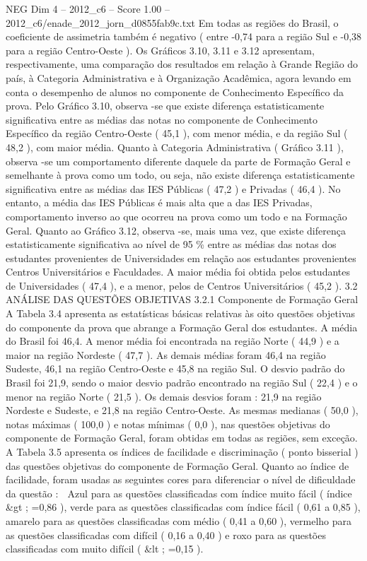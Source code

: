 \begin{textsample}{NEG Dim 4 – 2012\_c6 – Score 1.00 – 2012\_c6/enade\_2012\_jorn\_d0855fab9c.txt}
Em todas as regiões do Brasil, o coeficiente de assimetria também é negativo ( entre -0,74 para a região Sul e -0,38 para a região Centro-Oeste ).
Os Gráficos 3.10, 3.11 e 3.12 apresentam, respectivamente, uma comparação dos resultados em relação à Grande Região do país, à Categoria Administrativa e à Organização Acadêmica, agora levando em conta o desempenho de alunos no componente de Conhecimento Específico da prova.
Pelo Gráfico 3.10, observa -se que existe diferença estatisticamente significativa entre as médias das notas no componente de Conhecimento Específico da região Centro-Oeste ( 45,1 ), com menor média, e da região Sul ( 48,2 ), com maior média.
Quanto à Categoria Administrativa ( Gráfico 3.11 ), observa -se um comportamento diferente daquele da parte de Formação Geral e semelhante à prova como um todo, ou seja, não existe diferença estatisticamente significativa entre as médias das IES Públicas ( 47,2 ) e Privadas ( 46,4 ).
No entanto, a média das IES Públicas é mais alta que a das IES Privadas, comportamento inverso ao que ocorreu na prova como um todo e na Formação Geral.
Quanto ao Gráfico 3.12, observa -se, mais uma vez, que existe diferença estatisticamente significativa ao nível de 95 \% entre as médias das notas dos estudantes provenientes de Universidades em relação aos estudantes provenientes Centros Universitários e Faculdades.
A maior média foi obtida pelos estudantes de Universidades ( 47,4 ), e a menor, pelos de Centros Universitários ( 45,2 ). 3.2 ANÁLISE DAS QUESTÕES OBJETIVAS 3.2.1 Componente de Formação Geral A Tabela 3.4 apresenta as estatísticas básicas relativas às oito questões objetivas do componente da prova que abrange a Formação Geral dos estudantes.
A média do Brasil foi 46,4.
A menor média foi encontrada na região Norte ( 44,9 ) e a maior na região Nordeste ( 47,7 ).
As demais médias foram 46,4 na região Sudeste, 46,1 na região Centro-Oeste e 45,8 na região Sul.
O desvio padrão do Brasil foi 21,9, sendo o maior desvio padrão encontrado na região Sul ( 22,4 ) e o menor na região Norte ( 21,5 ).
Os demais desvios foram : 21,9 na região Nordeste e Sudeste, e 21,8 na região Centro-Oeste.
As mesmas medianas ( 50,0 ), notas máximas ( 100,0 ) e notas mínimas ( 0,0 ), nas questões objetivas do componente de Formação Geral, foram obtidas em todas as regiões, sem exceção.
A Tabela 3.5 apresenta os índices de facilidade e discriminação ( ponto bisserial ) das questões objetivas do componente de Formação Geral.
Quanto ao índice de facilidade, foram usadas as seguintes cores para diferenciar o nível de dificuldade da questão :  Azul para as questões classificadas com índice muito fácil ( índice \&gt ; =0,86 ), verde para as questões classificadas com índice fácil ( 0,61 a 0,85 ), amarelo para as questões classificadas com médio ( 0,41 a 0,60 ), vermelho para as questões classificadas com difícil ( 0,16 a 0,40 ) e roxo para as questões classificadas com muito difícil ( \&lt ; =0,15 ).

\end{textsample}
